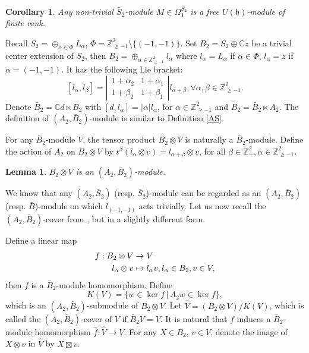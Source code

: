 \documentclass[12pt,a4paper]{amsart}
\newtheorem{Corollary}[Theorem]{Corollary}
\newtheorem{Lemma}[Theorem]{Lemma}
\def\a{\alpha}
\begin{document}
\begin{Corollary}\label{fin-r}
Any non-trivial $\bar{S}_2$-module $M\in \Omega^{\bar{S}_2}_{\mathbf{1}}$ is a free $U(\mathfrak{h})$-module of finite rank.
\end{Corollary}






Recall $S_2=\oplus_{\alpha \in \Phi} L_{\alpha}$, $\Phi=\mathbb{Z}^{2}_{\geq-1}\setminus\{(-1,-1)\}$.
Set $B_2=S_2\oplus \mathbb{C}z$ be a trivial center extension of $S_2$, then $B_2=\oplus_{\alpha \in \mathbb{Z}^{2}_{\geq-1}} l_{\alpha}$ where $l_{\alpha}=L_{\alpha}$ if $\alpha\in \Phi$, $l_{\alpha}=z$ if $\alpha=(-1,-1)$. It has the following Lie bracket:
$$[l_{\a},l_{\beta}]=\left|\begin{array}{cc}
1+\a_2 & 1+\a_1\\
1+\beta_2 & 1+\beta_1
\end{array}\right|l_{\a+\beta},\forall \a,\beta\in\mathbb{Z}^{2}_{\geq-1}.$$
Denote $\bar{B}_2=\mathbb{C}d \ltimes B_2$ with $[d,l_\a]=|\a|l_\a$, for $\a\in\mathbb{Z}^{2}_{\geq-1}$ and $\widetilde{B}_2=\bar{B}_2 \ltimes A_2$.
The definition of $(A_2,\bar{B}_2)$-module is similar to Definition \ref{AS}.


For any $\bar{B}_2$-module $V$, the tensor product $B_2 \otimes V$ is
naturally a $\bar{B}_2$-module. Define the action of $A_2$ on $B_2 \otimes V$ by $t^{\beta}(l_{\alpha} \otimes v)=l_{\alpha+\beta}\otimes v$, for all $\beta\in\mathbb{Z}^2_{+},\a\in\mathbb{Z}^{2}_{\geq-1}$.

\begin{Lemma}\emph{\cite{HL1}}
$B_2\otimes V$ is an $(A_2,\bar{B}_2)$-module.
\end{Lemma}

We know that any $(A_2,\bar{S}_2)$ (resp. $\bar{S}_2$)-module can be regarded as an $(A_2, \bar{B}_2)$ (resp. $\bar{B}$)-module on which $l_{(-1,-1)}$ acts trivially.
Let us now recall the $(A_2,\bar{B}_2)$-cover from \cite{YVF}, but in a slightly different form.

Define a linear map
$$\aligned f: B_2\otimes V &\rightarrow V \\
l_{\alpha}\otimes v &\mapsto l_{\alpha}v, l_{\alpha}\in B_2,  v\in V,\endaligned$$
then $f$ is a $\bar{B}_2$-module homomorphism. Define
$$K(V)=\{w\in \ker f \, | \, A_{2}w\in \ker f\},$$
which is an $(A_2, \bar{B}_2)$-submodule of $B_2\otimes V$. Let $\widehat{V}=(B_2\otimes V)/ K(V)$, which is called the $(A_2,\bar{B}_2)$-cover of $V$ if $\bar{B}_2V=V$. It is natural that $f$ induces a $\bar{B}_2$-module homomorphism $\hat{f}: \widehat{V} \rightarrow V$. For any $X\in B_2$, $v\in V$, denote the image of $X\otimes v$ in $\widehat{V}$ by $X\boxtimes v$.
\end{document}
